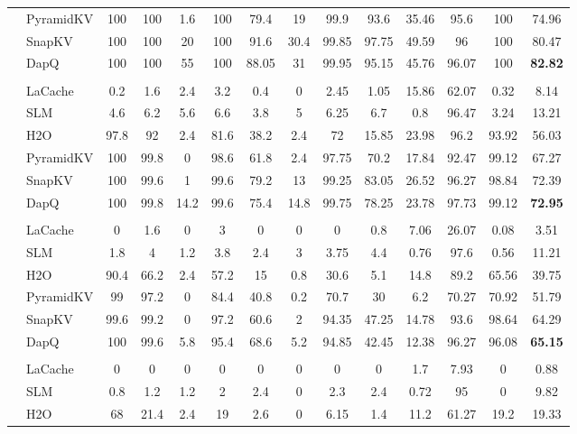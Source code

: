 \begin{table}[t]
{\begin{tabular}{>{\bfseries}c >{\raggedright}p{2.2cm} *{12}{c}}
& PyramidKV & 100 & 100 & 1.6 & 100 & 79.4 & 19 & 99.9 & 93.6 & 35.46 & 95.6 & 100 & 74.96 \\
& SnapKV & 100 & 100 & 20 & 100 & 91.6 & 30.4 & 99.85 & 97.75 & 49.59 & 96 & 100 & 80.47 \\
& DapQ & 100 & 100 & 55 & 100 & 88.05 & 31 & 99.95 & 95.15 & 45.76 & 96.07 & 100 & \textbf{82.82} \\
& \multicolumn{13}{c}{\cellcolor{gray!20}\textbf{KV Cache Size = 1024}} \\
& LaCache & 0.2 & 1.6 & 2.4 & 3.2 & 0.4 & 0 & 2.45 & 1.05 & 15.86 & 62.07 & 0.32 & 8.14 \\
& SLM & 4.6 & 6.2 & 5.6 & 6.6 & 3.8 & 5 & 6.25 & 6.7 & 0.8 & 96.47 & 3.24 & 13.21 \\
& H2O & 97.8 & 92 & 2.4 & 81.6 & 38.2 & 2.4 & 72 & 15.85 & 23.98 & 96.2 & 93.92 & 56.03 \\
& PyramidKV & 100 & 99.8 & 0 & 98.6 & 61.8 & 2.4 & 97.75 & 70.2 & 17.84 & 92.47 & 99.12 & 67.27 \\
& SnapKV & 100 & 99.6 & 1 & 99.6 & 79.2 & 13 & 99.25 & 83.05 & 26.52 & 96.27 & 98.84 & 72.39 \\
& DapQ & 100 & 99.8 & 14.2 & 99.6 & 75.4 & 14.8 & 99.75 & 78.25 & 23.78 & 97.73 & 99.12 & \textbf{72.95} \\
& \multicolumn{13}{c}{\cellcolor{gray!20}\textbf{KV Cache Size = 512}} \\
& LaCache & 0 & 1.6 & 0 & 3 & 0 & 0 & 0 & 0.8 & 7.06 & 26.07 & 0.08 & 3.51 \\
& SLM & 1.8 & 4 & 1.2 & 3.8 & 2.4 & 3 & 3.75 & 4.4 & 0.76 & 97.6 & 0.56 & 11.21 \\
& H2O & 90.4 & 66.2 & 2.4 & 57.2 & 15 & 0.8 & 30.6 & 5.1 & 14.8 & 89.2 & 65.56 & 39.75 \\
& PyramidKV & 99 & 97.2 & 0 & 84.4 & 40.8 & 0.2 & 70.7 & 30 & 6.2 & 70.27 & 70.92 & 51.79 \\
& SnapKV & 99.6 & 99.2 & 0 & 97.2 & 60.6 & 2 & 94.35 & 47.25 & 14.78 & 93.6 & 98.64 & 64.29 \\
& DapQ & 100 & 99.6 & 5.8 & 95.4 & 68.6 & 5.2 & 94.85 & 42.45 & 12.38 & 96.27 & 96.08 & \textbf{65.15} \\
& \multicolumn{13}{c}{\cellcolor{gray!20}\textbf{KV Cache Size = 256}} \\
& LaCache & 0 & 0 & 0 & 0 & 0 & 0 & 0 & 0 & 1.7 & 7.93 & 0 & 0.88 \\
& SLM & 0.8 & 1.2 & 1.2 & 2 & 2.4 & 0 & 2.3 & 2.4 & 0.72 & 95 & 0 & 9.82 \\
& H2O & 68 & 21.4 & 2.4 & 19 & 2.6 & 0 & 6.15 & 1.4 & 11.2 & 61.27 & 19.2 & 19.33 \\

\end{tabular}}
\end{table}
